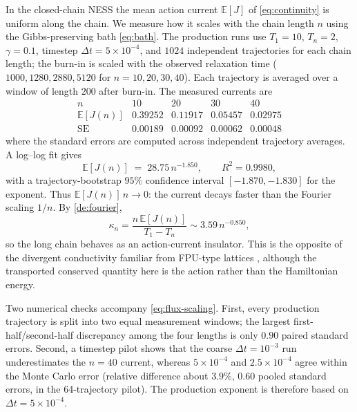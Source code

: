 \documentclass[11pt,a4paper]{article}
\theoremstyle{definition}
\newcommand{\E}{\mathbb{E}}
\numberwithin{equation}{section}   %
\begin{document}
In the closed-chain NESS the mean action current $\E[J]$ of
\eqref{eq:continuity} is uniform along the chain. We measure how it scales with
the chain length $n$ using the Gibbs-preserving bath \eqref{eq:bath}. The
production runs use $T_1=10$, $T_n=2$, $\gamma=0.1$, timestep
$\Delta t=5\times10^{-4}$, and $1024$ independent trajectories for each chain
length; the burn-in is scaled with the observed relaxation time
($1000,1280,2880,5120$ for $n=10,20,30,40$). Each trajectory is averaged over a
window of length $200$ after burn-in. The measured currents are
\[
\begin{array}{c|cccc}
n & 10 & 20 & 30 & 40\\ \hline
\E[J(n)] &
0.39252 & 0.11917 & 0.05457 & 0.02975\\
\mathrm{SE} &
0.00189 & 0.00092 & 0.00062 & 0.00048
\end{array}
\]
where the standard errors are computed across independent trajectory averages.
A log--log fit gives
\begin{equation}\label{eq:flux-scaling}
  \E[J(n)] \;=\; 28.75\,n^{-1.850},
  \qquad R^2=0.9980,
\end{equation}
with a trajectory-bootstrap $95\%$ confidence interval
$[-1.870,-1.830]$ for the exponent. Thus $\E[J(n)]\,n\to0$: the current decays
faster than the Fourier scaling $1/n$. By \cref{de:fourier},
\[
  \kappa_n=\frac{n\,\E[J(n)]}{T_1-T_n}
  \sim 3.59\,n^{-0.850},
\]
so the long chain behaves as an action-current insulator. This is the opposite
of the divergent conductivity familiar from FPU-type lattices
\cite{LepriLiviPoliti}, although the transported conserved quantity here is the
action rather than the Hamiltonian energy.

Two numerical checks accompany \eqref{eq:flux-scaling}. First, every production
trajectory is split into two equal measurement windows; the largest
first-half/second-half discrepancy among the four lengths is only $0.90$
paired standard errors. Second, a timestep pilot shows that the coarse
$\Delta t=10^{-3}$ run underestimates the $n=40$ current, whereas
$5\times10^{-4}$ and $2.5\times10^{-4}$ agree within the Monte Carlo error
(relative difference about $3.9\%$, $0.60$ pooled standard errors, in the
64-trajectory pilot). The production exponent is therefore based on
$\Delta t=5\times10^{-4}$.
\end{document}
